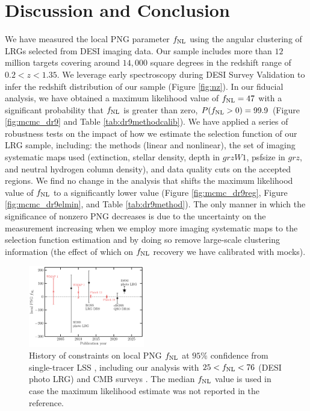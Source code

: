 \section{Discussion and Conclusion}\label{sec:conclusion}

We have measured the local PNG parameter $f_{\rm NL}$ using the angular clustering of LRGs selected from DESI imaging data. Our sample includes more than $12$ million targets covering around $14,000$ square degrees in the redshift range of $0.2< z < 1.35$. We leverage early spectroscopy during DESI Survey Validation to infer the redshift distribution of our sample (Figure \ref{fig:nz}). In our fiducial analysis, we have obtained a maximum likelihood value of $f_{\rm NL}=47$ with a significant probability that $f_{\rm NL}$ is greater than zero, $P(f_{\rm NL}>0)=99.9$ (Figure \ref{fig:mcmc_dr9} and Table \ref{tab:dr9methodcalib}). We have applied a series of robustness tests on the impact of how we estimate the selection function of our LRG sample, including: the methods (linear and nonlinear), the set of imaging systematic maps used (extinction, stellar density, depth in $grzW1$, psfsize in $grz$, and neutral hydrogen column density), and data quality cuts on the accepted regions. We find no change in the analysis that shifts the maximum likelihood value of $f_{\rm NL}$ to a significantly lower value (Figure \ref{fig:mcmc_dr9reg}, Figure \ref{fig:mcmc_dr9elmin}, and Table \ref{tab:dr9method}). The only manner in which the significance of nonzero PNG decreases is due to the uncertainty on the measurement increasing when we employ more imaging systematic maps to the selection function estimation and by doing so remove large-scale clustering information (the effect of which on $f_{\rm NL}$ recovery we have calibrated with mocks).

\begin{figure}
    \centering
    \includegraphics[width=0.45\textwidth]{figures/fnl_history.pdf}
    \caption{History of constraints on local PNG $f_{\rm NL}$ at $95\%$ confidence from single-tracer LSS \citep{slosar2008constraints,2013MNRAS.428.1116R, mueller2022primordial}, including our analysis with $25<f_{\rm NL}<76$ (DESI photo LRG) and CMB surveys \citep{Komatsu_2003, Komatsu_2010, planck13, akrami2019planck}. The median $f_{\rm NL}$ value is used in case the maximum likelihood estimate was not reported in the reference.}
    \label{fig:fnlhist}
\end{figure}

